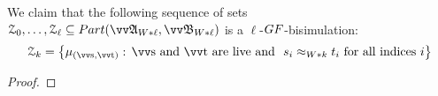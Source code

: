 We claim that the following sequence of sets $\bisimZ_{0}, \ldots, \bisimZ_{\ell} \subseteq \PartIso{\unravel{A}_{W * \ell}}{\unravel{B}_{W * \ell}}$ is a $\ell$-$\GF$-bisimulation:
\begin{equation*}
  \bisimZ_{k} = \left\{
    \mu_{(\elemtuptuples, \elemtuptuplet)}:\,
    \elemtuptuples\ \text{and}\ \elemtuptuplet\ \text{are live and}\ \
    s_{i} \approx_{W * k} t_{i}\ \text{for all indices $i$}
  \right\}
\end{equation*}
\begin{proof}
\end{proof}
